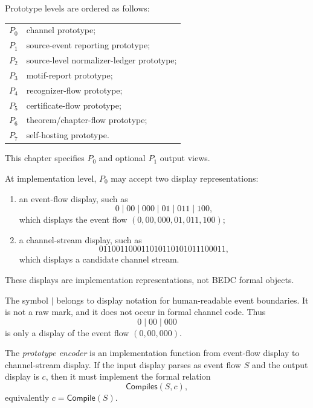 \begin{definition}
\label{def:minimal-prototype-level}
Prototype levels are ordered as follows:
\begin{center}
\begin{tabular}{ll}
$P_0$ & channel prototype;\\
$P_1$ & source-event reporting prototype;\\
$P_2$ & source-level normalizer-ledger prototype;\\
$P_3$ & motif-report prototype;\\
$P_4$ & recognizer-flow prototype;\\
$P_5$ & certificate-flow prototype;\\
$P_6$ & theorem/chapter-flow prototype;\\
$P_7$ & self-hosting prototype.
\end{tabular}
\end{center}
This chapter specifies $P_0$ and optional $P_1$ output views.
\end{definition}

\begin{definition}
\label{def:minimal-prototype-input-representations}
At implementation level, $P_0$ may accept two display representations:
\begin{enumerate}
\item an event-flow display, such as
$$
  0\mid 00\mid 000\mid 01\mid 011\mid 100,
$$
which displays the event flow $(0,00,000,01,011,100)$;
\item a channel-stream display, such as
$$
  011001100011010110101011100011,
$$
which displays a candidate channel stream.
\end{enumerate}
These displays are implementation representations, not BEDC formal objects.
\end{definition}

\begin{remark}
\label{rem:minimal-prototype-separator-not-formal}
The symbol $\mid$ belongs to display notation for human-readable event boundaries. It is not a raw mark, and it does not occur in formal channel code. Thus
$$
  0\mid 00\mid 000
$$
is only a display of the event flow $(0,00,000)$.
\end{remark}

\begin{definition}
\label{def:minimal-prototype-encoder}
The \emph{prototype encoder} is an implementation function from event-flow display to channel-stream display. If the input display parses as event flow $S$ and the output display is $c$, then it must implement the formal relation
$$
  \mathsf{Compiles}(S,c),
$$
equivalently $c=\mathsf{Compile}(S)$.
\end{definition}


